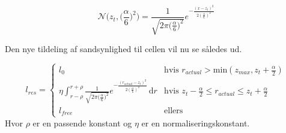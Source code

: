 $$\mathcal{N}\bigg(z_t,\bigg(\frac{\alpha}{6}\bigg)^2\bigg) = 
\frac{1}{\sqrt{2 \pi \big(\frac{\alpha}{6}\big)^2}}e^{- \frac{(x - z_t)^2}{2 (\frac{\alpha}{6})^2}}$$

Den nye tildeling af sandsynlighed til cellen vil nu se således ud.

$$l_{res} = \begin{cases} 
	l_0 &\text{hvis }r_{actual} > \text{min}(z_{max},z_t+\frac{\alpha}{2}) \\ 
	
	
	\eta \int_{r-\rho}^{r+\rho} \frac{1}{\sqrt{2 \pi \big(\frac{\alpha}{6}\big)^2}}e^{- \frac{(r_{actual} - z_t)^2}{2 (\frac{\alpha}{6})^2}}\, \mathrm{d}r
		&\text{hvis } z_t-\frac{\alpha}{2} \leq r_{actual} \leq z_t+\frac{\alpha}{2}\\ 

	l_{free} &\text{ellers}	
\end{cases}$$
Hvor $\rho$ er en passende konstant og $\eta$ er en normaliseringskonstant.






%
%
%
%
%
%
%
%
%
%
%
%
%
%
%
%
%
%














\
